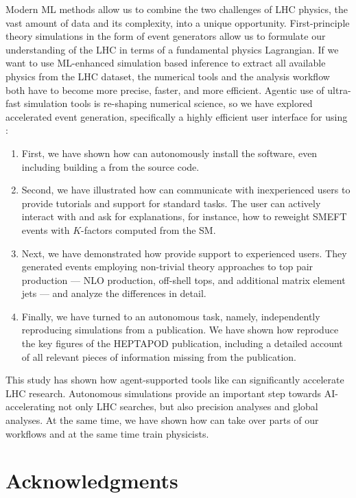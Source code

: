 \documentclass[submission, Phys]{SciPost}
\begin{document}
Modern ML methods allow us to combine the two challenges of LHC physics, the vast amount of data and its complexity, into a unique opportunity. First-principle theory simulations in the form of event generators allow us to formulate our understanding of the LHC in terms of a fundamental physics Lagrangian. If we want to use ML-enhanced simulation based inference to extract all available physics from the LHC dataset, the numerical tools and the analysis workflow both have to become more precise, faster, and more efficient. Agentic use of ultra-fast simulation tools is re-shaping numerical science, so we have explored accelerated event generation, specifically a highly efficient user interface for \mg using \ma:
%
\begin{enumerate}
\item First, we have shown how \ma can autonomously install the \mg software, even including building a \root from the source code.
\item Second, we have illustrated how \ma can communicate with inexperienced users to provide tutorials and support for standard tasks. The user can actively interact with \ma and ask for explanations, for instance, how to re\-weight SMEFT events with $K$-factors computed from the SM.
\item Next, we have demonstrated how \ma provide support to experienced users. They generated events employing non-trivial theory approaches to top pair production ---  NLO production, off-shell tops, and additional matrix element jets --- and analyze the differences in detail.
\item Finally, we have turned to an autonomous task, namely, independently reproducing simulations from a publication. We have shown how \ma reproduce the key figures of the HEPTAPOD publication, including a detailed account of all relevant pieces of information missing from the publication.
\end{enumerate}
%
This study has shown how agent-supported tools like \mg can significantly accelerate LHC research. Autonomous simulations provide an important step towards AI-accelerating not only LHC searches, but also precision analyses and global analyses. At the same time, we have shown how \ma can take over parts of our workflows and at the same time train physicists.

\section*{Acknowledgments}
\end{document}

